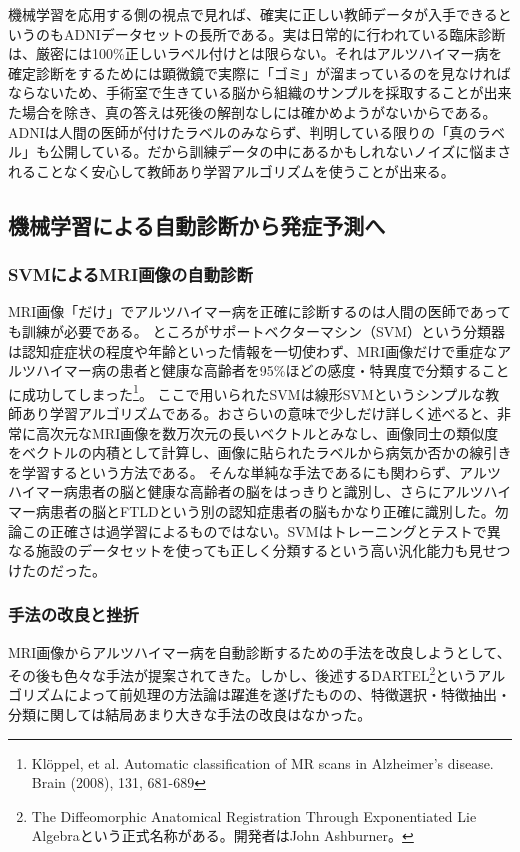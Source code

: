 機械学習を応用する側の視点で見れば、確実に正しい教師データが入手できるというのもADNIデータセットの長所である。実は日常的に行われている臨床診断は、厳密には100\%正しいラベル付けとは限らない。それはアルツハイマー病を確定診断をするためには顕微鏡で実際に「ゴミ」が溜まっているのを見なければならないため、手術室で生きている脳から組織のサンプルを採取することが出来た場合を除き、真の答えは死後の解剖なしには確かめようがないからである。ADNIは人間の医師が付けたラベルのみならず、判明している限りの「真のラベル」も公開している。だから訓練データの中にあるかもしれないノイズに悩まされることなく安心して教師あり学習アルゴリズムを使うことが出来る。
\subsection{機械学習による自動診断から発症予測へ}

\subsubsection{SVMによるMRI画像の自動診断}
MRI画像「だけ」でアルツハイマー病を正確に診断するのは人間の医師であっても訓練が必要である。
ところがサポートベクターマシン（SVM）という分類器は認知症症状の程度や年齢といった情報を一切使わず、MRI画像だけで重症なアルツハイマー病の患者と健康な高齢者を95\%ほどの感度・特異度で分類することに成功してしまった\footnote{Kl\"{o}ppel, et al. Automatic classification of MR scans in Alzheimer's disease. Brain (2008), 131, 681-689}。
ここで用いられたSVMは線形SVMというシンプルな教師あり学習アルゴリズムである。おさらいの意味で少しだけ詳しく述べると、非常に高次元なMRI画像を数万次元の長いベクトルとみなし、画像同士の類似度をベクトルの内積として計算し、画像に貼られたラベルから病気か否かの線引きを学習するという方法である。
そんな単純な手法であるにも関わらず、アルツハイマー病患者の脳と健康な高齢者の脳をはっきりと識別し、さらにアルツハイマー病患者の脳とFTLDという別の認知症患者の脳もかなり正確に識別した。勿論この正確さは過学習によるものではない。SVMはトレーニングとテストで異なる施設のデータセットを使っても正しく分類するという高い汎化能力も見せつけたのだった。

\subsubsection{手法の改良と挫折}
MRI画像からアルツハイマー病を自動診断するための手法を改良しようとして、その後も色々な手法が提案されてきた。しかし、後述するDARTEL\footnote{The Diffeomorphic Anatomical Registration Through Exponentiated Lie Algebraという正式名称がある。開発者はJohn Ashburner。}というアルゴリズムによって前処理の方法論は躍進を遂げたものの、特徴選択・特徴抽出・分類に関しては結局あまり大きな手法の改良はなかった。


